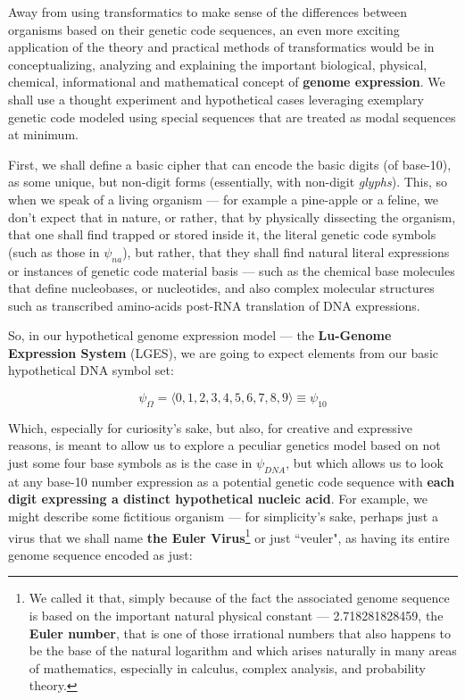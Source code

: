 \documentclass[a4paper, 18pt]{book} %
\begin{document}
Away from using transformatics to make sense of the differences between organisms based on their genetic code sequences, an even more exciting application of the theory and practical methods of transformatics would be in conceptualizing, analyzing and explaining the important biological, physical, chemical, informational and mathematical concept of \textbf{genome expression}. We shall use a thought experiment and hypothetical cases leveraging exemplary genetic code modeled using special sequences that are treated as modal sequences at minimum.

First, we shall define a basic cipher that can encode the basic digits (of base-10), as some unique, but non-digit forms (essentially, with non-digit \textit{glyphs}). This, so when we speak of a living organism --- for example a pine-apple or a feline, we don't expect that in nature, or rather, that by physically dissecting the organism, that one shall find trapped or stored inside it, the literal genetic code symbols (such as those in $\psi_{na}$), but rather, that they shall find natural literal expressions or instances of genetic code material basis --- such as the chemical base molecules that define nucleobases, or nucleotides, and also complex molecular structures such as transcribed amino-acids post-RNA translation of DNA expressions.

So, in our hypothetical genome expression model --- the \textbf{Lu-Genome Expression System} (LGES), we are going to expect elements from our basic hypothetical DNA symbol set:

\begin{equation}
\label{EQHYPDNASS}
\psi_{\Omega} = \langle 0, 1, 2, 3, 4, 5, 6, 7, 8, 9 \rangle \equiv \psi_{10}
\end{equation}

Which, especially for curiosity's sake, but also, for creative and expressive reasons, is meant to allow us to explore a peculiar genetics model based on not just some four base symbols as is the case in $\psi_{DNA}$, but which allows us to look at any base-10 number expression as a potential genetic code sequence with \textbf{each digit expressing a distinct hypothetical nucleic acid}. For example, we might describe some fictitious organism --- for simplicity's sake, perhaps just a virus that we shall name \textbf{the Euler Virus}\footnote{We called it that, simply because of the fact the associated genome sequence is based on the important natural physical constant --- 2.718281828459, the \textbf{Euler number}, that is one of those irrational numbers that also happens to be the base of the natural logarithm and which arises naturally in many areas of mathematics, especially in calculus, complex analysis, and probability theory.} or just ``veuler", as having its entire genome sequence encoded as just:
\end{document}
